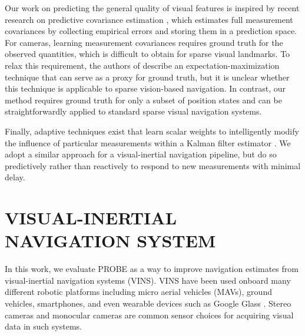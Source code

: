 \documentclass[letterpaper, 10 pt, conference]{ieeeconf}  %
\begin{document}
Our work on predicting the general quality of visual features is inspired by recent research on predictive covariance estimation \cite{VegaBrown:ew}, which estimates full measurement covariances by collecting empirical errors and storing them in a prediction space.
For cameras, learning measurement covariances requires ground truth for the observed quantities, which is difficult to obtain for sparse visual landmarks.
To relax this requirement, the authors of \cite{VegaBrown:2013fv} describe an expectation-maximization technique that can serve as a proxy for ground truth, but it is unclear whether this technique is applicable to sparse vision-based navigation.
In contrast, our method requires ground truth for only a subset of position states and can be straightforwardly applied to standard sparse visual navigation systems.

Finally, adaptive techniques exist that learn scalar weights to intelligently modify the influence of particular measurements within a Kalman filter estimator  \cite{Ting:2007js}. We adopt a similar approach for a visual-inertial navigation pipeline, but do so predictively rather than reactively to respond to new measurements with minimal delay.%



\section{VISUAL-INERTIAL NAVIGATION SYSTEM} \label{sec:vins}
In this work, we evaluate PROBE as a way to improve navigation estimates from visual-inertial navigation systems (VINS).  VINS have been used onboard many different robotic platforms including micro aerial vehicles (MAVs), ground vehicles, smartphones, and even wearable devices such as Google Glass \cite{Anonymous:m8ztJh1D}. Stereo cameras \cite{Leutenegger:2014hk} and monocular cameras \cite{Anonymous:5tilMnYo, Indelman:2013bca} are common sensor choices for acquiring visual data in such systems.
\end{document}
